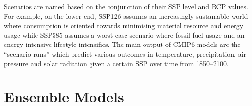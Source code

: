 \documentclass[honours,12pt]{unswthesis}
\numberwithin{equation}{section}
\begin{document}
\begin{table}[ht]
    \centering
    \vspace{1pt}
    \caption{Representative Concentration Pathways}
    \label{table:rcp}
\end{table}

{\noindent}Scenarios are named based on the conjunction of their SSP level and RCP values. 
For example, on the lower end, SSP126 assumes an increasingly sustainable world where consumption is oriented towards 
minimising material resource and energy usage while SSP585 assumes a worst case scenario where fossil fuel usage and an energy-intensive lifestyle intensifies.
The main output of CMIP6 models are the ``scenario runs'' which predict various outcomes in temperature, precipitation, air pressure and solar radiation given a certain SSP over time from 1850--2100.

{\section{Ensemble Models}}\label{ensemble}
\end{document}

